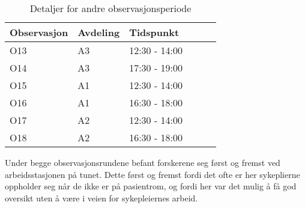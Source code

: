 \begin{table}[H]\centering
    \begin{tabular}{ |l|l|l|l|l|l| }
    \hline
    Observasjon & Avdeling & Tidspunkt \\ \hline
       O13 & A3 & 12:30 - 14:00 \\ \hline
       O14 & A3 & 17:30 - 19:00 \\ \hline
      O15 & A1 & 12:30 - 14:00 \\ \hline
       O16 & A1 & 16:30 - 18:00 \\ \hline
         O17 & A2 & 12:30 - 14:00 \\ \hline
       O18 & A2 & 16:30 - 18:00 \\ \hline
    \end{tabular}
    \caption {Detaljer for andre observasjonsperiode}
    \label{detaljer2}
\end{table}
 
Under begge observasjonsrundene befant forskerene seg først og fremst ved arbeidsstasjonen på tunet. Dette først og fremst fordi det ofte er her sykeplierne oppholder seg når de ikke er på pasientrom, og fordi her var det mulig å få god oversikt uten å være i veien for sykepleiernes arbeid.
 